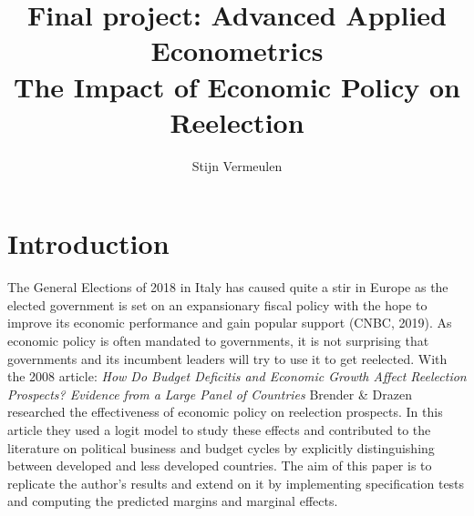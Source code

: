 \documentclass[12pt]{article}
\begin{document}
\author{Stijn Vermeulen}
\title{Final project: Advanced Applied Econometrics \\ The Impact of Economic Policy on Reelection}
\maketitle



\medskip
\section{Introduction}
The General Elections of 2018 in Italy has caused quite a stir in Europe as the elected government is set on an expansionary fiscal policy with the hope to improve its economic performance and gain popular support (CNBC, 2019). As economic policy is often mandated to governments, it is not surprising that governments and its incumbent leaders will try to use it to get reelected. With the 2008 article: \textit{How Do Budget Deficitis and Economic Growth Affect Reelection Prospects? Evidence from a Large Panel of Countries} Brender \& Drazen researched the effectiveness of economic policy on reelection prospects. In this article they used a logit model to study these effects and contributed to the literature on political business and budget cycles by explicitly distinguishing between developed and less developed countries. The aim of this paper is to replicate the author's results  and extend on it by implementing specification tests and computing the predicted margins and marginal effects.
\end{document}
